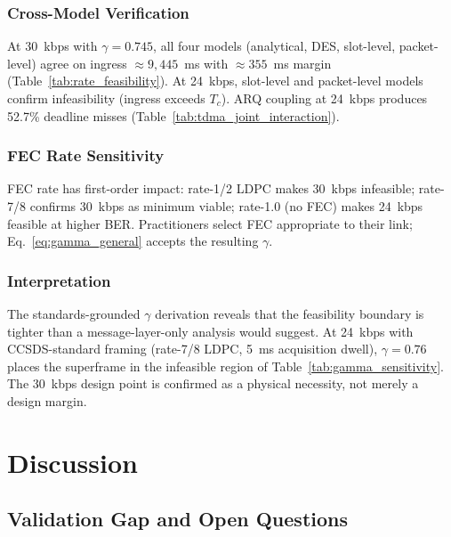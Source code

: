 \documentclass[journal]{IEEEtran}
\begin{document}
\subsubsection{Cross-Model Verification}

At 30~kbps with $\gamma = 0.745$, all four models (analytical, DES, slot-level, packet-level) agree on ingress $\approx 9{,}445$~ms with $\approx 355$~ms margin (Table~\ref{tab:rate_feasibility}). At 24~kbps, slot-level and packet-level models confirm infeasibility (ingress exceeds $T_c$). ARQ coupling at 24~kbps produces 52.7\% deadline misses (Table~\ref{tab:tdma_joint_interaction}).

\subsubsection{FEC Rate Sensitivity}

FEC rate has first-order impact: rate-1/2 LDPC makes 30~kbps infeasible; rate-7/8 confirms 30~kbps as minimum viable; rate-1.0 (no FEC) makes 24~kbps feasible at higher BER. Practitioners select FEC appropriate to their link; Eq.~\ref{eq:gamma_general} accepts the resulting $\gamma$.

\subsubsection{Interpretation}

The standards-grounded $\gamma$ derivation reveals that the feasibility boundary is tighter than a message-layer-only analysis would suggest. At 24~kbps with CCSDS-standard framing (rate-7/8 LDPC, 5~ms acquisition dwell), $\gamma = 0.76$ places the superframe in the infeasible region of Table~\ref{tab:gamma_sensitivity}. The 30~kbps design point is confirmed as a physical necessity, not merely a design margin.

\section{Discussion}

\subsection{Validation Gap and Open Questions}
\label{sec:validation_gap}
\end{document}
